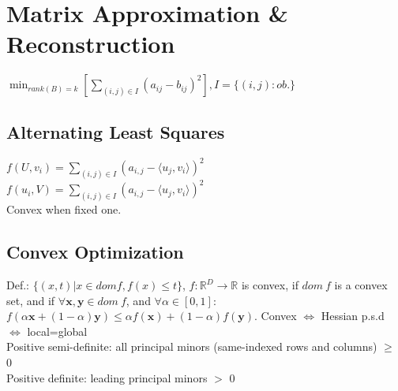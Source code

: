 \section{Matrix Approximation \& Reconstruction}

$\min_{rank(B)=k}[\sum_{(i,j)\in I}{(a_{ij}-b_{ij})^2}], I=\{(i,j): \mathit{ob.}\}$
\subsection*{Alternating Least Squares}
$f(U,v_i) = \sum_{(i,j)\in I} (a_{i,j} - \langle u_j, v_i \rangle)^2$\\
$f(u_i,V) = \sum_{(i,j)\in I} (a_{i,j} - \langle u_j, v_i \rangle)^2$\\
Convex when fixed one.




\subsection*{Convex Optimization}
Def.: $\{(x,t)|x \in dom f, f(x) \leq t\}$, $f : \mathbb{R}^D \rightarrow \mathbb{R}$ is convex, if $dom\ f$ is a convex set, and if $\forall \mathbf{x}, \mathbf{y} \in dom\ f$, and $\forall \alpha\in[0,1]$: $f(\alpha \mathbf{x} + (1 - \alpha)\mathbf{y}) \leq \alpha f(\mathbf{x}) + (1-\alpha)f(\mathbf{y})$. 
Convex $\iff$ Hessian p.s.d $\iff$ local=global \\
Positive semi-definite: all principal minors (same-indexed rows and columns) $\geq$ 0\\
Positive definite: leading principal minors $>$ 0

